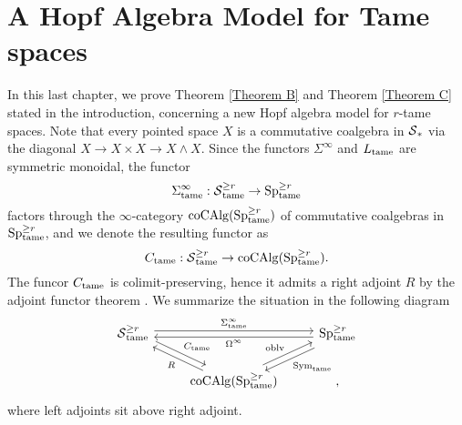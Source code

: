 \chapter{A Hopf Algebra Model for Tame spaces}

In this last chapter, we prove Theorem \ref{Theorem B} and Theorem \ref{Theorem C} stated in the introduction,
concerning a new Hopf algebra model for $r$-tame spaces. Note that every pointed space $X$ is a commutative coalgebra in $\operatorname{\mathcal{S}}_*$ via the diagonal $X\to X\times X \to X\wedge X$. Since the functors $\Sigma^{\infty}$ and $L_{\operatorname{\operatorname{tame}}}$ are symmetric monoidal, the functor
$$
\Sigma^{\infty}_{\operatorname{\operatorname{tame}}}: \operatorname{\mathcal{S}}^{\geq r}_{\operatorname{\operatorname{tame}}}  \to \operatorname{Sp}^{\geq r}_{\operatorname{\operatorname{tame}}}
$$
factors through the $\infty$-category $\operatorname{coCAlg}(\operatorname{Sp}^{\geq r}_{\operatorname{\operatorname{tame}}})$ of commutative coalgebras in $\operatorname{Sp}^{\geq r}_{\operatorname{\operatorname{tame}}}$, and we denote the resulting functor as
$$
C_{\operatorname{\operatorname{tame}}}:  \operatorname{\mathcal{S}}^{\geq r}_{\operatorname{\operatorname{tame}}}
\to 
\operatorname{coCAlg}(\operatorname{Sp}^{\geq r}_{\operatorname{\operatorname{tame}}}).
$$
The funcor $C_{\operatorname{\operatorname{tame}}}$ is colimit-preserving, hence it admits a right adjoint $R$ by the adjoint functor theorem \cite[Corollary 5.5.2.9.]{HTT}. 
We summarize the situation in the following diagram
\[
\begin{tikzcd}
	\Space^{\geq r}_{\tame} &   & \Sp^{\geq r}_{\tame} \\
	&  \coCAlg(\Sp^{\geq r}_{\tame}) &
	\arrow[from=1-1, to = 1-3, "\Sigma^{\infty}_{\tame}", shift left]
	\arrow[from=1-3, to = 1-1, "\Omega^{\infty}", shift left]
	\arrow[from=1-1 , to =2-2, "C_{\tame}", shift left]
	\arrow[from=2-2 , to =1-1, "R", shift left]
	\arrow[from=2-2, to=1-3, "\oblv", shift left]
	\arrow[from=1-3, to=2-2, "\Sym_{\tame}", shift left],
\end{tikzcd}
\]
where left adjoints sit above right adjoint.

